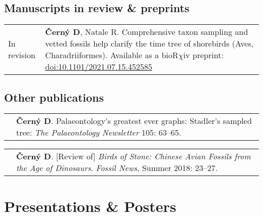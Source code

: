 \documentclass[10pt]{article}
\begin{document}
\subsection*{Manuscripts in review \& preprints}

\begin{tabularx}{\textwidth}{>{\raggedleft\arraybackslash}p{2.2cm} X}
In revision & \textbf{\v{C}ern\'{y} D}, Natale R. Comprehensive taxon sampling and vetted fossils help clarify the time tree of shorebirds (Aves, Charadriiformes). Available as a bioR$\chi$iv preprint: \href{http://www.biorxiv.org/content/10.1101/2021.07.15.452585v1}{doi:10.1101/2021.07.15.452585}
\end{tabularx}

\subsection*{Other publications}

\begin{tabularx}{\textwidth}{>{\raggedleft\arraybackslash}p{2.2cm} X}
2020 & \textbf{\v{C}ern\'{y} D}. Palaeontology's greatest ever graphs:
Stadler's sampled tree: \textit{The Palaeontology Newsletter} 105: 63--65.
\end{tabularx}
\begin{tabularx}{\textwidth}{>{\raggedleft\arraybackslash}p{2.2cm} X}
2018 & \textbf{\v{C}ern\'{y} D}. [Review of] \textit{Birds of Stone: Chinese Avian Fossils from the Age of Dinosaurs}. \textit{Fossil News}, Summer 2018: 23--27.
\end{tabularx}

\section*{Presentations \& Posters}
\end{document}
